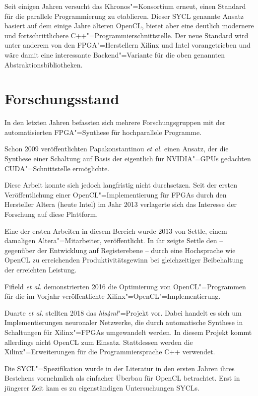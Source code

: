 Seit einigen Jahren versucht das Khronos"=Konsortium erneut, einen Standard für
die parallele Programmierung zu etablieren. Dieser SYCL genannte Ansatz basiert
auf dem einige Jahre älteren OpenCL, bietet aber eine deutlich modernere und
fortschrittlichere C++"=Programmierschnittstelle. Der neue Standard wird unter
anderem von den FPGA"=Herstellern Xilinx und Intel vorangetrieben und wäre damit
eine interessante Backend"=Variante für die oben genannten
Abstraktionsbibliotheken.

\section{Forschungsstand}\label{einleitung:forschung}

In den letzten Jahren befassten sich mehrere Forschungsgruppen mit der
automatisierten \mbox{FPGA}"=Synthese für hochparallele Programme.

Schon 2009 veröffentlichten Papakonstantinou \textit{et al.} einen Ansatz, der
die Synthese einer Schaltung auf Basis der eigentlich für NVIDIA"=GPUs gedachten
CUDA"=Schnittstelle ermöglichte. \cite[vgl.][]{papakonstantinou2009} 

Diese Arbeit konnte sich jedoch langfristig nicht durchsetzen. Seit der ersten
Veröffentlichung einer OpenCL"=Implementierung für FPGAs durch den Hersteller
Altera (heute Intel) im Jahr 2013 verlagerte sich das Interesse der Forschung
auf diese Plattform. 

Eine der ersten Arbeiten in diesem Bereich wurde 2013 von Settle, einem
damaligen Altera"=Mitarbeiter, veröffentlicht. In ihr zeigte Settle den
-- gegenüber der Entwicklung auf Registerebene -- durch eine Hochsprache wie
OpenCL zu erreichenden Produktivitätsgewinn bei gleichzeitiger Beibehaltung der
erreichten Leistung. \cite[vgl.][]{settle2013}

Fifield \textit{et al.} demonstrierten 2016 die Optimierung von
OpenCL"=Programmen für die im Vorjahr veröffentlichte
Xilinx"=OpenCL"=Implementierung. \cite[vgl.][]{fifield2016}

Duarte \textit{et al.} stellten 2018 das \textit{hls4ml}"=Projekt vor. Dabei
handelt es sich um Implementierungen neuronaler Netzwerke, die durch
automatische Synthese in Schaltungen für Xilinx"=FPGAs umgewandelt werden. In
diesem Projekt kommt allerdings nicht OpenCL zum Einsatz. Stattdessen werden
die Xilinx"=Erweiterungen für die Programmiersprache C++ verwendet.
\cite[vgl.][]{duarte2018}

Die SYCL"=Spezifikation wurde in der Literatur in den ersten Jahren ihres
Bestehens vornehmlich als einfacher Überbau für OpenCL betrachtet. Erst in
jüngerer Zeit kam es zu eigenständigen Untersuchungen SYCLs.


